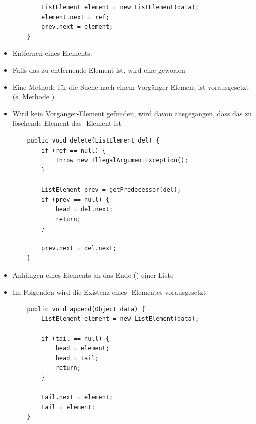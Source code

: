 \begin{itemize}
\begin{verbatim}
        ListElement element = new ListElement(data);
        element.next = ref;
        prev.next = element;
    }
    \end{verbatim}
    \item Entfernen eines Elements:
    \item[] Falls das zu entfernende Element  ist, wird eine  geworfen
    \item[] Eine Methode für die Suche nach einem Vorgänger-Element ist
    vorausgesetzt (s. Methode )
    \item[] Wird kein Vorgänger-Element gefunden, wird davon ausgegangen, dass
    das zu löschende Element das -Element ist
    \begin{verbatim}
    public void delete(ListElement del) {
        if (ref == null) {
            throw new IllegalArgumentException();
        }

        ListElement prev = getPredecessor(del);
        if (prev == null) {
            head = del.next;
            return;
        }

        prev.next = del.next;
    }
    \end{verbatim}
    \item Anhängen eines Elements an das Ende () einer Liste
    \item[] Im Folgenden wird die Existenz eines -Elementes vorausgesetzt
    \begin{verbatim}
    public void append(Object data) {
        ListElement element = new ListElement(data);

        if (tail == null) {
            head = element;
            head = tail;
            return;
        }

        tail.next = element;
        tail = element;
    }
    \end{verbatim}
\end{itemize}


